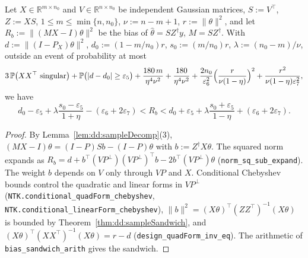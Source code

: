 \begin{theorem}\label{thm:dd:sampleBiasSandwich}
  \leanok
Let $X\in\mathbb R^{m\times n_0}$ and $V\in\mathbb R^{n\times n_0}$ be independent Gaussian matrices, $S:=V^\top$, $Z:=XS$, $1\le m\le\min\{n,n_0\}$, $\nu:=n-m+1$, $r:=\|\theta\|^2$, and let $R_b:=\|(MX-I)\theta\|^2$ be the bias of $\hat\theta=SZ^\dagger y$, $M=SZ^\dagger$. With $d:=\|(I-P_X)\theta\|^2$, $d_0:=(1-m/n_0)r$, $s_0:=(m/n_0)r$, $\lambda:=(n_0-m)/\nu$, outside an event of probability at most
\[
  3\,\mathbb P\bigl(XX^\top\text{ singular}\bigr)+\mathbb P\bigl(|d-d_0|\ge\varepsilon_5\bigr)+\frac{180\,m}{\eta^4\nu^2}+\frac{180}{\eta^4\nu^2}+\frac{2n_0}{\varepsilon_6^2}\Bigl(\frac{r}{\nu(1-\eta)}\Bigr)^2+\frac{r^2}{\nu(1-\eta)\varepsilon_7^2},
\]
we have
\[
  d_0-\varepsilon_5+\lambda\frac{s_0-\varepsilon_5}{1+\eta}-(\varepsilon_6+2\varepsilon_7)<R_b<d_0+\varepsilon_5+\lambda\frac{s_0+\varepsilon_5}{1-\eta}+(\varepsilon_6+2\varepsilon_7).
\]
\end{theorem}

\begin{proof}
  \leanok
By Lemma~\ref{lem:dd:sampleDecomp}(3), $(MX-I)\theta=(I-P)Sb-(I-P)\theta$ with $b:=Z^\dagger X\theta$. The squared norm expands as $R_b=d+b^\top(VP^\perp)(VP^\perp)^\top b-2b^\top(VP^\perp)\theta$ (\texttt{norm\_sq\_sub\_expand}). The weight $b$ depends on $V$ only through $VP$ and $X$. Conditional Chebyshev bounds control the quadratic and linear forms in $VP^\perp$ (\texttt{NTK.conditional\_quadForm\_chebyshev}, \texttt{NTK.conditional\_linearForm\_chebyshev}), $\|b\|^2=(X\theta)^\top(ZZ^\top)^{-1}(X\theta)$ is bounded by Theorem~\ref{thm:dd:sampleSandwich}, and $(X\theta)^\top(XX^\top)^{-1}(X\theta)=r-d$ (\texttt{design\_quadForm\_inv\_eq}). The arithmetic of \texttt{bias\_sandwich\_arith} gives the sandwich.
\end{proof}

